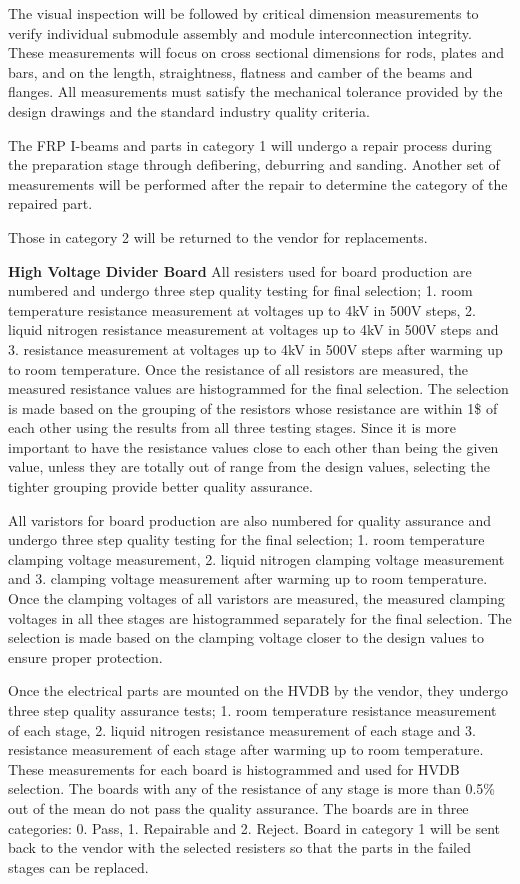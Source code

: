 The visual inspection will be followed by critical dimension measurements to verify individual submodule assembly and module interconnection integrity.  These measurements will focus on cross sectional dimensions for rods, plates and bars, and on the length, straightness, flatness and camber of the beams and flanges.
All measurements must satisfy the mechanical tolerance provided by the design drawings and the standard industry quality criteria.

The FRP I-beams and parts in category 1 will undergo a repair process during the preparation stage through defibering, deburring and sanding.  Another set of measurements will be performed after the repair to determine the category of the repaired part.

Those in category 2 will be returned to the vendor for replacements.

{\bf High Voltage Divider Board}
All resisters used for board production are numbered and undergo three step quality testing for final selection; 1. room temperature resistance measurement at voltages up to 4kV in 500V steps, 2. liquid nitrogen resistance measurement at voltages up to 4kV in 500V steps and 3. resistance measurement at voltages up to 4kV in 500V steps after warming up to room temperature.  Once the resistance of all resistors are measured, the measured resistance values are histogrammed for the final selection.   The selection is made based on the grouping of the resistors whose resistance are within 1\$ of each other using the results from all three testing stages.   Since it is more important to have the resistance values close to each other than being the given value, unless they are totally out of range from the design values, selecting the tighter grouping provide better quality assurance.  

All varistors for board production are also numbered for quality assurance and undergo three step quality testing for the final selection; 1. room temperature clamping voltage measurement, 2. liquid nitrogen clamping voltage measurement and 3. clamping voltage measurement after warming up to room temperature.  Once the clamping voltages of all varistors are measured, the measured clamping voltages in all thee stages are histogrammed separately for the final selection.   The selection is made based on the clamping voltage closer to the design values to ensure proper protection.   

Once the electrical parts are mounted on the HVDB by the vendor, they undergo three step quality assurance tests; 1. room temperature resistance measurement of each stage, 2. liquid nitrogen resistance measurement of each stage and 3. resistance measurement of each stage after warming up to room temperature.  These measurements for each board is histogrammed and used for HVDB selection.  The boards with any of the resistance of any stage is more than 0.5\% out of the mean do not pass the quality assurance.  The boards are in three categories: 0. Pass, 1. Repairable and 2. Reject.  Board in category 1 will be sent back to the vendor with the selected resisters so that the parts in the failed stages can be replaced.

